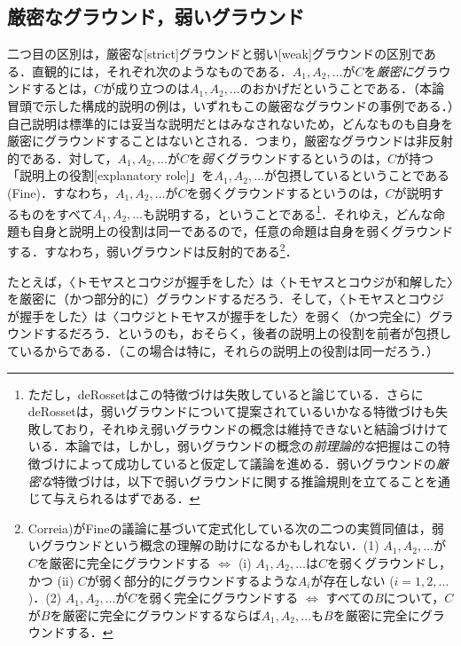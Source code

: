 \documentclass[twoside,14Q,dvipdfmx]{jsarticle}
\theoremstyle{definition}
\begin{document}
\subsection{厳密なグラウンド，弱いグラウンド}
二つ目の区別は，厳密な[strict]グラウンドと弱い[weak]グラウンドの区別である．直観的には，それぞれ次のようなものである．$A_1, A_2, \ldots$が$C$を\emph{厳密に}グラウンドするとは，$C$が成り立つのは$A_1, A_2, \ldots$のおかげだということである．（本論冒頭で示した構成的説明の例は，いずれもこの厳密なグラウンドの事例である．）自己説明は標準的には妥当な説明だとはみなされないため，どんなものも自身を厳密にグラウンドすることはないとされる．つまり，厳密なグラウンドは非反射的である．対して，$A_1, A_2, \ldots$が$C$を\emph{弱く}グラウンドするというのは，$C$が持つ「説明上の役割[explanatory role]」を$A_1, A_2, \ldots$が包摂しているということである(Fine\cite[p.3]{Fine2012b})．すなわち，$A_1, A_2, \ldots$が$C$を弱くグラウンドするというのは，$C$が説明するものをすべて$A_1, A_2, \ldots$も説明する，ということである\footnote{ただし，deRosset\cite[pp.715--8]{deRosset2014}はこの特徴づけは失敗していると論じている．さらにdeRossetは，弱いグラウンドについて提案されているいかなる特徴づけも失敗しており，それゆえ弱いグラウンドの概念は維持できないと結論づけけている．本論では，しかし，弱いグラウンドの概念の\emph{前理論的な}把握はこの特徴づけによって成功していると仮定して議論を進める．弱いグラウンドの\emph{厳密な}特徴づけは，以下で弱いグラウンドに関する推論規則を立てることを通じて与えられるはずである．}．それゆえ，どんな命題も自身と説明上の役割は同一であるので，任意の命題は自身を弱くグラウンドする．すなわち，弱いグラウンドは反射的である\footnote{Correia\cite[p.510]{Correia2017})がFine\cite{Fine2012b}の議論に基づいて定式化している次の二つの実質同値は，弱いグラウンドという概念の理解の助けになるかもしれない．(1) $A_1, A_2, \ldots$が$C$を厳密に完全にグラウンドする $\Leftrightarrow$ (i) $A_1, A_2, \ldots$は$C$を弱くグラウンドし，かつ (ii) $C$が弱く部分的にグラウンドするような$A_i$が存在しない ($i=1, 2, \ldots$)．(2) $A_1, A_2, \ldots$が$C$を弱く完全にグラウンドする $\Leftrightarrow$ すべての$B$について，$C$が$B$を厳密に完全にグラウンドするならば$A_1, A_2, \ldots$も$B$を厳密に完全にグラウンドする．}．

たとえば，〈トモヤスとコウジが握手をした〉は〈トモヤスとコウジが和解した〉を厳密に（かつ部分的に）グラウンドするだろう．そして，〈トモヤスとコウジが握手をした〉は〈コウジとトモヤスが握手をした〉を弱く（かつ完全に）グラウンドするだろう．というのも，おそらく，後者の説明上の役割を前者が包摂しているからである．（この場合は特に，それらの説明上の役割は同一だろう．）
\end{document}
